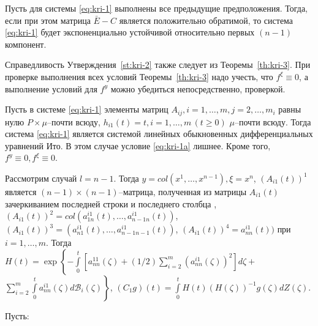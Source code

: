 \begin{statement}\label{st:kri-2}
    Пусть для системы \eqref{eq:kri-1} выполнены все
    предыдущие предположения. Тогда, если при этом матрица $\bar E - C$
    является положительно обратимой, то система \eqref{eq:kri-1} будет
    экспоненциально устойчивой относительно первых $(n-1)$ компонент.
\end{statement}

Справедливость Утверждения~\ref{st:kri-2} также следует из Теоремы~\ref{th:kri-3}. При
проверке выполнения всех условий Теоремы~\ref{th:kri-3}  надо учесть, что $f^\xi
\equiv 0$, а выполнение условий для $f^y $ можно убедиться
непосредственно, проверкой.

Пусть в системе \eqref{eq:kri-1} элементы матриц $A_{ij}, i = 1, \dots, m, j = 2,
\dots, m_i$ равны нулю $P\times\mu$--почти всюду,   $h_{i1}(t) = t, i
= 1, \dots, m \, (t \geq 0)$ $\mu $--почти всюду. Тогда система \eqref{eq:kri-1}
является системой линейных обыкновенных дифференциальных уравнений
Ито. В этом случае условие \eqref{eq:kri-1a} лишнее. Кроме того, $f^y \equiv 0,
f^\xi \equiv 0$.

Рассмотрим случай  $l = n-1$. Тогда $y = col(x^1,\dots,x^{n-1}), \xi =
x^n$, $(A_{i1}(t))^1$ является $(n-1)\times (n-1)$--матрица,
полученная из матрицы $A_{i1}(t)$ зачеркиванием последней строки и
последнего столбца , $(A_{i1}(t))^2 =
col(a^{i1}_{1n}(t),\dots,a^{i1}_{n-1 n}(t))$, $(A_{i1}(t))^3 =
(a^{i1}_{n1}(t),\dots,a^{i1}_{n-1n-1}(t))$, $(A_{i1}(t))^4 =
a^{i1}_{nn}(t))$ при $i = 1,\dots,m $. Тогда $H(t) = \exp \left
\{-\int \limits _{0}^t [a^{11}_{nn}(\zeta) + (1/2)\sum \limits
_{i=2}^m (a^{i1}_{nn}(\zeta))^2]d\zeta  + \right .$ $\left . \sum
\limits_{i=2}^m \int \limits
 _0^t a^{i1}_{nn}(\zeta)d\mathcal B_i(\zeta)\right \}$, $(C_1g)(t) = \int \limits
_{0}^tH(t)(H(\zeta))^{-1}g(\zeta)dZ(\zeta)$.

Пусть:

